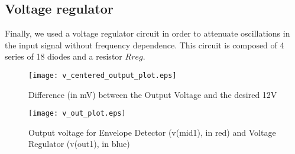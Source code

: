 \subsection{Voltage regulator}
Finally, we used a voltage regulator circuit in order to attenuate oscillations in the input signal without frequency dependence. This circuit is composed of 4 series of 18 diodes and a resistor $Rreg$.

\begin{figure}[H] \centering
\texttt{[image: v\_centered\_output\_plot.eps]}
\caption{Difference (in mV) between the Output Voltage and the desired 12V}
\label{fig:phase_sim}
\end{figure}

\begin{figure}[H] \centering
\texttt{[image: v\_out\_plot.eps]}
\caption{Output voltage for Envelope Detector (v(mid1), in red) and Voltage Regulator (v(out1), in blue)}
\label{fig:octave_centered_output}
\end{figure}
